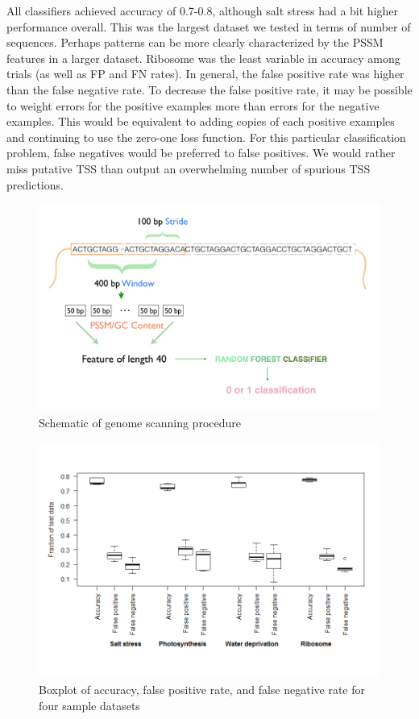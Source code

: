\documentclass[12pt,letterpaper]{report}
\begin{document}
\indent All classifiers achieved accuracy of 0.7-0.8, although salt stress had a bit higher performance overall. This was the largest dataset we tested in terms of number of sequences. Perhaps patterns can be more clearly characterized by the PSSM features in a larger dataset. Ribosome was the least variable in accuracy among trials (as well as FP and FN rates). In general, the false positive rate was higher than the false negative rate. To decrease the false positive rate, it may be possible to weight errors for the positive examples more than errors for the negative examples. This would be equivalent to adding copies of each positive examples and continuing to use the zero-one loss function. For this particular classification problem, false negatives would be preferred to false positives. We would rather miss putative TSS than output an overwhelming number of spurious TSS predictions.\\
\begin{figure}[]
\centering
\includegraphics[scale=0.5]{window.png}
\caption{Schematic of genome scanning procedure}
\label{fig:window}
\end{figure}

\begin{figure}
\centering
\includegraphics[scale=0.8]{Rplot.png}
\caption{Boxplot of accuracy, false positive rate, and false negative rate for four sample datasets}
\label{fig:box}
\end{figure}
\end{document}
